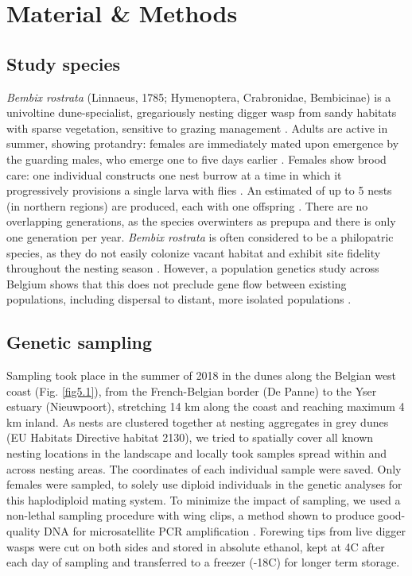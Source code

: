 \documentclass[10pt, twoside]{book} %
\begin{document}
	\section{Material \& Methods}
		\subsection{Study species}
		\textit{Bembix rostrata} (Linnaeus, 1785; Hymenoptera, Crabronidae, Bembicinae) is a univoltine dune-specialist, gregariously nesting digger wasp from sandy habitats with sparse vegetation, sensitive to grazing management \citep[chapter \ref{chapter3}]{larsson1986, klein2004, bonte2005, batsleer2022a}. Adults are active in summer, showing protandry: females are immediately mated upon emergence by the guarding males, who emerge one to five days earlier \citep{wiklund1977, schone1981, evans2007}. Females show brood care: one individual constructs one nest burrow at a time in which it progressively provisions a single larva with flies \citep{nielsen1945, field2020}. An estimated of up to 5 nests (in northern regions) are produced, each with one offspring \citep{larsson1989}. There are no overlapping generations, as the species overwinters as prepupa and there is only one generation per year. \textit{Bembix rostrata} is often considered to be a philopatric species, as they do not easily colonize vacant habitat and exhibit site fidelity throughout the nesting season \citep[chapter \ref{chapter2}]{nielsen1945, larsson1986, bogusch2021, batsleer2022}. However, a population genetics study across Belgium shows that this does not preclude gene flow between existing populations, including dispersal to distant, more isolated populations \citep[chapter \ref{chapter4}]{batsleer2022b}.\\
		
		\subsection{Genetic sampling}
		Sampling took place in the summer of 2018 in the dunes along the Belgian west coast (Fig. \ref{fig5.1}), from the French-Belgian border (De Panne) to the Yser estuary (Nieuwpoort), stretching 14 km along the coast and reaching maximum 4 km inland. As nests are clustered together at nesting aggregates in grey dunes (EU Habitats Directive habitat 2130), we tried to spatially cover all known nesting locations in the landscape and locally took samples spread within and across nesting areas. The coordinates of each individual sample were saved. Only females were sampled, to solely use diploid individuals in the genetic analyses for this haplodiploid mating system. To minimize the impact of sampling, we used a non-lethal sampling procedure with wing clips, a method shown to produce good-quality DNA for microsatellite PCR amplification \citep{chaline2004}. Forewing tips from live digger wasps were cut on both sides and stored in absolute ethanol, kept at 4\textdegree C after each day of sampling and transferred to a freezer (-18\textdegree C) for longer term storage.\\
		
\end{document}

